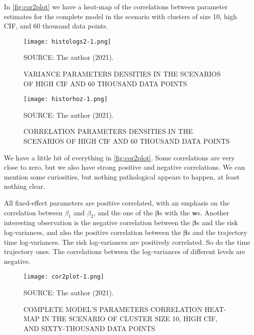 In \autoref{fig:cor2plot} we have a heat-map of the correlations between
parameter estimates for the complete model in the scenario with clusters
of size 10, high CIF, and 60 thousand data points.

\begin{figure}[!htpb]
 \setlength{\abovecaptionskip}{.0001pt}
 \caption{VARIANCE PARAMETERS DENSITIES IN THE SCENARIOS OF HIGH CIF AND
          60 THOUSAND DATA POINTS}
 \vspace{0.2cm}\centering
 \texttt{[image: histologs2-1.png]}\\
 \begin{footnotesize}
  SOURCE: The author (2021).
 \end{footnotesize}
 \label{fig:histologs2}
\end{figure}

\begin{figure}[H]
 \setlength{\abovecaptionskip}{.0001pt}
 \caption{CORRELATION PARAMETERS DENSITIES IN THE SCENARIOS OF HIGH CIF
          AND 60 THOUSAND DATA POINTS}
 \vspace{0.2cm}\centering
 \texttt{[image: historhoz-1.png]}\\
 \begin{footnotesize}
  SOURCE: The author (2021).
 \end{footnotesize}
 \label{fig:historhoz}
\end{figure}

We have a little bit of everything in \autoref{fig:cor2plot}. Some
correlations are very close to zero, but we also have strong positive
and negative correlations. We can mention some curiosities, but nothing
pathological appears to happen, at least nothing clear.

All fixed-effect parameters are positive correlated, with an emphasis on
the correlation between \(\beta_{1}\) and \(\beta_{2}\), and the one of
the \(\bm{\beta}\)s with the \(\bm{w}\)s. Another interesting
observation is the negative correlation between the \(\bm{\beta}\)s and
the risk log-variances, and also the positive correlation between the
\(\bm{\beta}\)s and the trajectory time log-variances. The risk
log-variances are positively correlated. So do the time trajectory
ones. The correlations between the log-variances of different levels are
negative.

\begin{figure}[H]
 \setlength{\abovecaptionskip}{.0001pt}
 \caption{COMPLETE MODEL'S PARAMETERS CORRELATION HEAT-MAP IN THE
          SCENARIO OF CLUSTER SIZE 10, HIGH CIF, AND SIXTY-THOUSAND DATA
          POINTS}
 \centering
 \texttt{[image: cor2plot-1.png]}\\
 \vspace{-0.2cm}
 \begin{footnotesize}
  SOURCE: The author (2021).
 \end{footnotesize}
 \label{fig:cor2plot}
\end{figure}

